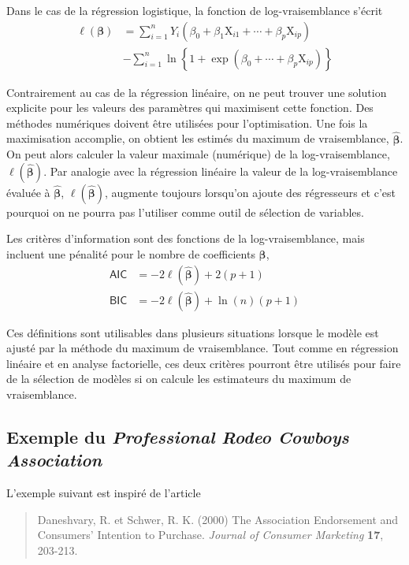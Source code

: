 \documentclass[
  11pt,
  letterpaper,
]{scrbook}
\theoremstyle{definition}
\theoremstyle{remark}
\begin{document}
Dans le cas de la régression logistique, la fonction de
log-vraisemblance s'écrit \begin{align*}
 \ell(\boldsymbol{\beta}) &= \sum_{i=1}^n Y_i ( \beta_0 + \beta_1 \mathrm{X}_{i1} + \cdots + \beta_p \mathrm{X}_{ip}) \\&- \sum_{i=1}^n \ln\left\{1+\exp(\beta_0 + \cdots + \beta_p\mathrm{X}_{ip})\right\}
\end{align*}

Contrairement au cas de la régression linéaire, on ne peut trouver une
solution explicite pour les valeurs des paramètres qui maximisent cette
fonction. Des méthodes numériques doivent être utilisées pour
l'optimisation. Une fois la maximisation accomplie, on obtient les
estimés du maximum de vraisemblance, \(\widehat{\boldsymbol{\beta}}\).
On peut alors calculer la valeur maximale (numérique) de la
log-vraisemblance, \(\ell(\widehat{\boldsymbol{\beta}})\). Par analogie
avec la régression linéaire la valeur de la log-vraisemblance évaluée à
\(\widehat{\boldsymbol{\beta}}\),
\(\ell(\widehat{\boldsymbol{\beta}})\), augmente toujours lorsqu'on
ajoute des régresseurs et c'est pourquoi on ne pourra pas l'utiliser
comme outil de sélection de variables.

Les critères d'information sont des fonctions de la log-vraisemblance,
mais incluent une pénalité pour le nombre de coefficients
\(\boldsymbol{\beta}\), \begin{align*}
 \mathsf{AIC} & = -2 \ell(\widehat{\boldsymbol{\beta}}) + 2(p+1)\\
 \mathsf{BIC} & = -2 \ell(\widehat{\boldsymbol{\beta}}) + \ln(n)(p+1)
\end{align*}

Ces définitions sont utilisables dans plusieurs situations lorsque le
modèle est ajusté par la méthode du maximum de vraisemblance. Tout comme
en régression linéaire et en analyse factorielle, ces deux critères
pourront être utilisés pour faire de la sélection de modèles si on
calcule les estimateurs du maximum de vraisemblance.

\hypertarget{sec-cowboy}{%
\subsection{\texorpdfstring{Exemple du \emph{Professional Rodeo Cowboys
Association}}{Exemple du Professional Rodeo Cowboys Association}}\label{sec-cowboy}}

L'exemple suivant est inspiré de l'article

\begin{quote}
Daneshvary, R. et Schwer, R. K. (2000) The Association Endorsement and
Consumers' Intention to Purchase. \emph{Journal of Consumer Marketing}
\textbf{17}, 203-213.
\end{quote}
\end{document}
